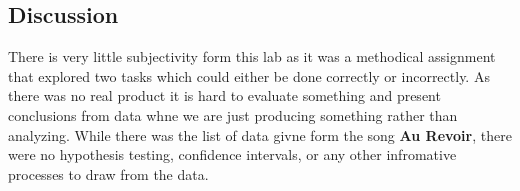 \documentclass{article}\usepackage[]{graphicx}\usepackage[]{xcolor}
\begin{document}
\begin{multicols}{2}
\section{Discussion}

There is very little subjectivity form this lab as it was a methodical assignment that explored two tasks which could either be done correctly or incorrectly. As there was no real product it is hard to evaluate something and present conclusions from data whne we are just producing something rather than analyzing. While there was the list of data givne form the song \textbf{Au Revoir}, there were no hypothesis testing, confidence intervals, or any other infromative processes to draw from the data. 

\vspace{2em}


\begin{tiny}

\end{tiny}
\end{multicols}

\newpage
\onecolumn
\end{document}
